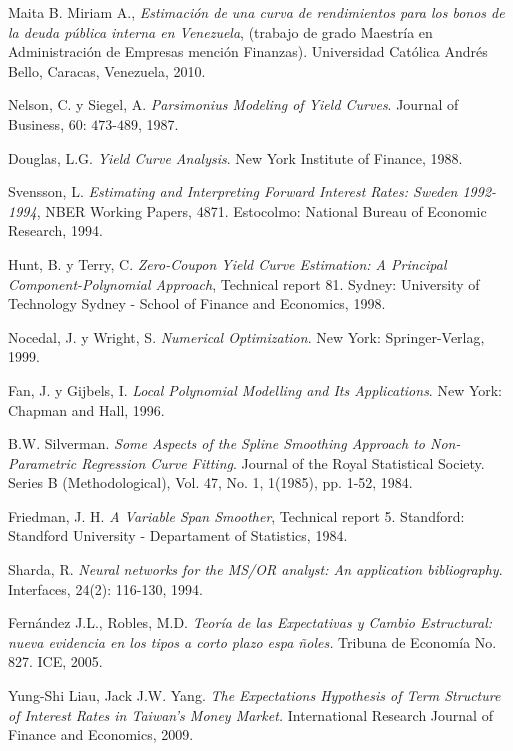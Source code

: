 \begin{thebibliography}{99}

 {\sc Maita B. Miriam A.}, {\it Estimaci\'on de una curva de rendimientos para los bonos de la deuda p\'ublica interna en Venezuela}, (trabajo de grado Maestr\'ia en Administraci\'on de Empresas menci\'on Finanzas).  Universidad Cat\'olica Andr\'es Bello, Caracas, Venezuela, 2010.

 {\sc Nelson, C. y Siegel, A.} {\it Parsimonius Modeling of Yield Curves}. Journal of
Business, $60$: $473$-$489$, 1987.

 {\sc Douglas, L.G.} {\it Yield Curve Analysis}. New York Institute of Finance, 1988.


 {\sc Svensson, L.} {\it Estimating and Interpreting Forward Interest Rates: Sweden 1992-1994}, NBER Working Papers, 4871. Estocolmo: National Bureau of Economic Research, 1994.

 Hunt, B. y Terry, C. {\it Zero-Coupon Yield Curve Estimation: A Principal Component-Polynomial Approach}, Technical report 81. Sydney: University of Technology Sydney - School of Finance and Economics, 1998.

 Nocedal, J. y Wright, S. {\it Numerical Optimization}. New York: Springer-Verlag, 1999.


 Fan, J. y Gijbels, I. {\it Local Polynomial Modelling and Its Applications}. New York: Chapman and Hall, 1996.

 B.W. Silverman. {\it Some Aspects of the Spline Smoothing Approach to Non-Parametric Regression Curve Fitting}. Journal of the Royal Statistical Society. Series B (Methodological), Vol. 47, No. 1, 1(1985), pp. 1-52, 1984.


 Friedman, J. H. {\it A Variable Span Smoother}, Technical report 5. Standford:
Standford University - Departament of Statistics, 1984.


 Sharda, R. {\it Neural networks for the MS/OR analyst: An application bibliography}. Interfaces, 24(2): 116-130, 1994.

 Fern\'andez J.L., Robles, M.D.  {\it Teor\'ia de las Expectativas y Cambio Estructural: nueva evidencia en los tipos a corto plazo espa \~noles.} Tribuna de Econom\'ia No. 827. ICE, 2005.

 Yung-Shi Liau, Jack J.W. Yang. {\it The Expectations Hypothesis of Term Structure of Interest Rates in Taiwan's Money Market.} International Research Journal of Finance and Economics, 2009.

\end{thebibliography}
